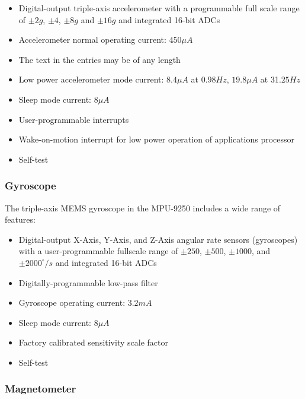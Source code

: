 \begin{itemize}
  \item Digital-output triple-axis accelerometer with a programmable full scale range  of $\pm 2g$, $\pm 4$, $\pm 8g$ and $\pm 16g$ and integrated 16-bit ADCs
  \item Accelerometer normal operating current: $450 \mu A$
  \item The text in the entries may be of any length
  \item Low power accelerometer mode current: $8.4 \mu A$ at $0.98Hz$, $19.8 \mu A$ at 31.$25Hz$
  \item Sleep mode current: $8 \mu A$
  \item User-programmable interrupts
  \item Wake-on-motion interrupt for low power operation of applications processor
  \item Self-test
\end{itemize}

\begin{figure}[H]
  \centering
  
\end{figure}

\subsubsection{Gyroscope}

The triple-axis MEMS gyroscope in the MPU-9250 includes a wide range of features:

\begin{itemize}
  \item Digital-output X-Axis, Y-Axis, and Z-Axis angular rate sensors (gyroscopes) with a user-programmable fullscale range of $\pm 250$, $\pm 500$, $\pm 1000$, and $\pm 2000^{\circ}/s$ and integrated 16-bit ADCs
  \item Digitally-programmable low-pass filter
  \item Gyroscope operating current: $3.2mA$
  \item Sleep mode current: $8 \mu A$
  \item Factory calibrated sensitivity scale factor
  \item Self-test
\end{itemize}

\begin{figure}[H]
  \centering
  
\end{figure}

\subsubsection{Magnetometer}

